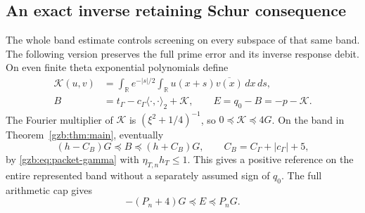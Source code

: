 \documentclass[11pt,a4paper]{article}
\numberwithin{equation}{section}
\theoremstyle{definition}\newtheorem{definition}[theorem]{Definition}
\theoremstyle{remark}\newtheorem{remark}[theorem]{Remark}
\newcommand{\R}{\mathbb R}\newcommand{\C}{\mathbb C}\newcommand{\N}{\mathbb N}
\newcommand{\tg}{t_\Gamma}\newcommand{\cg}{c_\Gamma}
\newcommand{\ip}[2]{\langle#1,#2\rangle}\newcommand{\norm}[1]{\lVert#1\rVert}\newcommand{\abs}[1]{\lvert#1\rvert}
\begin{document}
\subsection{An exact inverse retaining Schur consequence}\label{gzb:sec:schur}
The whole band estimate controls screening on every subspace of that same
band. The following version preserves the full prime error and its
inverse response debit.
On even finite theta exponential polynomials define
\begin{equation}\label{gzb:eq:reference}
\begin{split}
 \mathcal K(u,v)&=\int_\R e^{-|s|/2}
                     \int_\R u(x+s)\overline{v(x)}\,dx\,ds,\\
 B&=\tg-\cg\ip{\cdot}{\cdot}_2+\mathcal K,\qquad
 E=q_0-B=-p-\mathcal K.
\end{split}
\end{equation}
The Fourier multiplier of $\mathcal K$ is $(\xi^2+1/4)^{-1}$, so
$0\preceq\mathcal K\preceq4G$.
On the band in Theorem~\ref{gzb:thm:main}, eventually
\begin{equation}\label{gzb:eq:reference-bound}
 (h-C_B)G\preceq B\preceq(h+C_B)G,\qquad
 C_B=C_\Gamma+|\cg|+5,
\end{equation}
by \eqref{gzb:eq:packet-gamma} with $\eta_{T,n}h_T\le1$.
This gives a positive reference on the entire represented band without
a separately assumed sign of $q_0$.
The full arithmetic cap gives
\begin{equation}\label{gzb:eq:E-bound}
 -(P_n+4)G\preceq E\preceq P_nG.
\end{equation}
\end{document}
